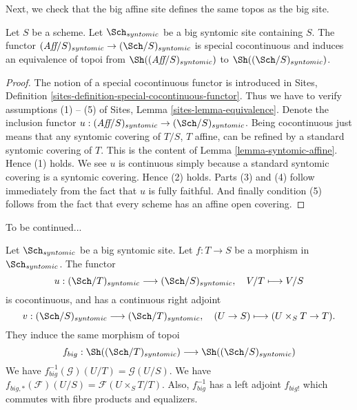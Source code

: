 \noindent
Next, we check that the big affine site defines the same
topos as the big site.

\begin{lemma}
\label{lemma-affine-big-site-syntomic}
Let $S$ be a scheme. Let $\Sch_{syntomic}$ be a big syntomic
site containing $S$.
The functor
$(\textit{Aff}/S)_{syntomic} \to (\Sch/S)_{syntomic}$
is special cocontinuous and induces an equivalence of topoi from
$\Sh((\textit{Aff}/S)_{syntomic})$ to
$\Sh((\Sch/S)_{syntomic})$.
\end{lemma}

\begin{proof}
The notion of a special cocontinuous functor is introduced in
Sites, Definition \ref{sites-definition-special-cocontinuous-functor}.
Thus we have to verify assumptions (1) -- (5) of
Sites, Lemma \ref{sites-lemma-equivalence}.
Denote the inclusion functor
$u : (\textit{Aff}/S)_{syntomic} \to (\Sch/S)_{syntomic}$.
Being cocontinuous just means that any syntomic covering of
$T/S$, $T$ affine, can be refined by a standard syntomic covering of $T$.
This is the content of
Lemma \ref{lemma-syntomic-affine}.
Hence (1) holds. We see $u$ is continuous simply because a standard
syntomic covering is a syntomic covering. Hence (2) holds.
Parts (3) and (4) follow immediately from the fact that $u$ is
fully faithful. And finally condition (5) follows from the
fact that every scheme has an affine open covering.
\end{proof}

\noindent
To be continued...

\begin{lemma}
\label{lemma-morphism-big-syntomic}
Let $\Sch_{syntomic}$ be a big syntomic site.
Let $f : T \to S$ be a morphism in $\Sch_{syntomic}$.
The functor
$$
u : (\Sch/T)_{syntomic} \longrightarrow (\Sch/S)_{syntomic},
\quad
V/T \longmapsto V/S
$$
is cocontinuous, and has a continuous right adjoint
$$
v : (\Sch/S)_{syntomic} \longrightarrow (\Sch/T)_{syntomic},
\quad
(U \to S) \longmapsto (U \times_S T \to T).
$$
They induce the same morphism of topoi
$$
f_{big} :
\Sh((\Sch/T)_{syntomic})
\longrightarrow
\Sh((\Sch/S)_{syntomic})
$$
We have $f_{big}^{-1}(\mathcal{G})(U/T) = \mathcal{G}(U/S)$.
We have $f_{big, *}(\mathcal{F})(U/S) = \mathcal{F}(U \times_S T/T)$.
Also, $f_{big}^{-1}$ has a left adjoint $f_{big!}$ which commutes with
fibre products and equalizers.
\end{lemma}

